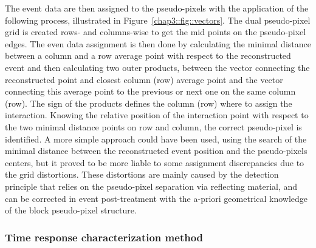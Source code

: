 The event data are then assigned to the pseudo-pixels with the application of the following process, illustrated in Figure~\ref{chap3::fig::vectors}. The dual pseudo-pixel grid is created rows- and columns-wise to get the mid points on the pseudo-pixel edges.  The even data assignment is then done by calculating the minimal distance between a column and a row average point with respect to the reconstructed event and then calculating two outer products, between the vector connecting the reconstructed point and closest column (row) average point and the vector connecting this average point to the previous or next one on the same column (row). The sign of the products defines the column (row) where to assign the interaction.  Knowing the relative position of the interaction point with respect to the two minimal distance points on row and column, the correct pseudo-pixel is identified.  A more simple approach could have been used, using the search of the minimal distance between the reconstructed event position and the pseudo-pixels centers, but it proved to be more liable to some assignment discrepancies due to the grid distortions. These distortions are mainly caused by the detection principle that relies on the pseudo-pixel separation via reflecting material, and can be corrected in event post-treatment with the a-priori geometrical knowledge of the block pseudo-pixel structure.


\subsubsection{Time response characterization method}\label{chap3::subsubsec::absTimeMethod}


